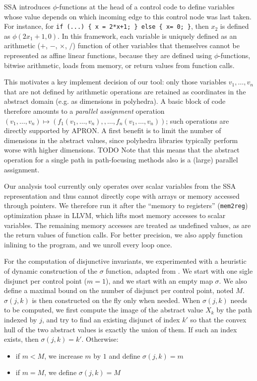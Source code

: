 \documentclass[preprint]{sigplanconf}
\begin{document}
SSA introduces $\phi$-functions at the head of a control code to define variables whose value depends on which incoming edge to this control node was last taken. For instance, for \lstinline|if (...) { x = 2*x+1; } else { x= 0; }|, then $x_2$ is defined as $\phi(2x_1+1,0)$. In this framework, each variable is uniquely defined as an arithmetic ($+$, $-$, $\times$, $/$) function of other variables that themselves cannot be represented as affine linear functions, because they are defined using $\phi$-functions, bitwise arithmetic, loads from memory, or return values from function calls.

This motivates a key implement decision of our tool: only those variables $v_1,\dots,v_n$ that are not defined by arithmetic operations are retained as coordinates in the abstract domain (e.g. as dimensions in polyhedra). A basic block of code therefore amounts to a \emph{parallel assignment} operation
$(v_1,\dots,v_n) \allowbreak\mapsto\allowbreak
(f_1(v_1,\dots,v_n), \allowbreak, \dots, \allowbreak
 f_n(v_1,\dots,v_n))$;
such operations are directly supported by APRON.
A first benefit is to limit the number of dimensions in the abstract values, since polyhedra libraries typically perform worse with higher dimensions. TODO
Note that this means that the abstract operation for a single path in path-focusing methods also is a (large) parallel assignment.

Our analysis tool currently only operates over scalar variables from the SSA representation and thus cannot directly cope with arrays or memory accessed through pointers. We therefore run it after the ``memory to registers'' (\texttt{mem2reg}) optimization phase in LLVM, which lifts most memory accesses to scalar variables.
The remaining memory accesses are treated as undefined values, as are the return
values of function calls. For better precision, we also apply function inlining
to the program, and we unroll every loop once.

For the computation of disjunctive invariants, we experimented with a heuristic
of dynamic construction of the $\sigma$ function, adapted from
\cite{DBLP:conf/pldi/GulwaniZ10}.  We start with one sigle
disjunct per control point ($m=1$), and we start with an empty map $\sigma$. We also
define a maximal bound on the number of disjunct per control point, noted $M$.
$\sigma(j,k)$ is then constructed on the fly only when needed.
When $\sigma(j,k)$ needs to be computed, we first compute the image of the
abstract value $X_k$ by the path indexed by $j$, and try to find an existing
disjunct of index $k'$ so that the convex hull of the two abstract values is
exactly the union of them. If such an index exists, then $\sigma(j,k) = k'$.
Otherwise:
\begin{itemize}
	\item if $m < M$, we increase $m$ by $1$ and define $\sigma(j,k) = m$
	\item if $m = M$, we define $\sigma(j,k) = M$
\end{itemize}
\end{document}
